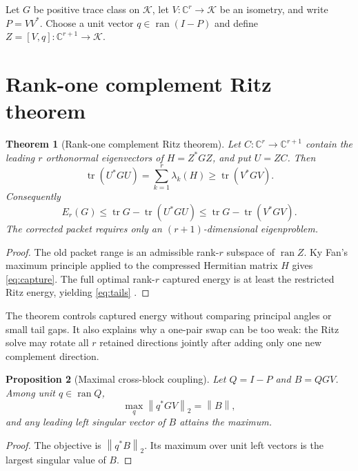 \documentclass[11pt]{article}
\newtheorem{theorem}{Theorem}[section]
\newtheorem{proposition}[theorem]{Proposition}
\theoremstyle{remark}
\newcommand{\norm}[1]{\left\lVert#1\right\rVert}
\begin{document}
Let $G$ be positive trace class on $\mathcal K$, let
$V:\mathbb C^r\to\mathcal K$ be an isometry, and write $P=VV^*$.  Choose a
unit vector $q\in\operatorname{ran}(I-P)$ and define
$Z=[V,q]:\mathbb C^{r+1}\to\mathcal K$.

\section{Rank-one complement Ritz theorem}

\begin{theorem}[Rank-one complement Ritz theorem]
\label{thm:ritz}
Let $C:\mathbb C^r\to\mathbb C^{r+1}$ contain the leading $r$ orthonormal
eigenvectors of $H=Z^*GZ$, and put $U=ZC$.  Then
\begin{equation}
 \operatorname{tr}(U^*GU)
 =\sum_{k=1}^r\lambda_k(H)
 \ge\operatorname{tr}(V^*GV).
 \label{eq:capture}
\end{equation}
Consequently
\begin{equation}
 E_r(G)\le\operatorname{tr}G-\operatorname{tr}(U^*GU)
 \le\operatorname{tr}G-\operatorname{tr}(V^*GV).
 \label{eq:tails}
\end{equation}
The corrected packet requires only an $(r+1)$-dimensional eigenproblem.
\end{theorem}

\begin{proof}
The old packet range is an admissible rank-$r$ subspace of
$\operatorname{ran}Z$.  Ky Fan's maximum principle applied to the compressed
Hermitian matrix $H$ gives \eqref{eq:capture}.  The full optimal rank-$r$
captured energy is at least the restricted Ritz energy, yielding
\eqref{eq:tails} \citep{Bhatia1997,Parlett1998}.
\end{proof}

The theorem controls captured energy without comparing principal angles or
small tail gaps.  It also explains why a one-pair swap can be too weak: the
Ritz solve may rotate all $r$ retained directions jointly after adding only
one new complement direction.

\begin{proposition}[Maximal cross-block coupling]
\label{prop:cross}
Let $Q=I-P$ and $B=QGV$.  Among unit $q\in\operatorname{ran}Q$,
\[
 \max_q\norm{q^*GV}_2=\norm B,
\]
and any leading left singular vector of $B$ attains the maximum.
\end{proposition}

\begin{proof}
The objective is $\norm{q^*B}_2$.  Its maximum over unit left vectors is the
largest singular value of $B$.
\end{proof}
\end{document}
